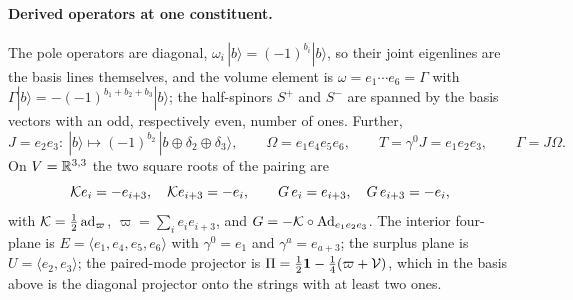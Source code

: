 \paragraph{Derived operators at one constituent.} The pole operators are diagonal, $\omega_i\,|b\rangle=(-1)^{b_i}|b\rangle$, so their joint eigenlines are the basis lines
themselves, and the volume element is $\omega=e_1\cdots e_6=\Gamma$ with $\Gamma|b\rangle=-(-1)^{b_1+b_2+b_3}|b\rangle$; the half-spinors $S^+$ and $S^-$ are spanned by the basis
vectors with an odd, respectively even, number of ones. Further,
\[
J=e_2e_3:\ |b\rangle\mapsto(-1)^{b_2}\,|b\oplus\delta_2\oplus\delta_3\rangle,\qquad \Omega=e_1e_4e_5e_6,\qquad T=\gamma^0J=e_1e_2e_3,\qquad \Gamma=J\Omega .
\]
On $V=\mathbb{R}^{3,3}$ the two square roots of the pairing are
\[
\mathcal K e_i=-e_{i+3},\quad \mathcal K e_{i+3}=-e_i,\qquad G\,e_i=e_{i+3},\quad G\,e_{i+3}=-e_i ,
\]
with $\mathcal K=\tfrac12\operatorname{ad}_{\varpi}$, $\varpi=\sum_ie_ie_{i+3}$, and $G=-\mathcal K\circ\operatorname{Ad}_{e_1e_2e_3}$. The interior four-plane is $E=\langle e_1,e_4,e_5,e_6\rangle$ with
$\gamma^0=e_1$ and $\gamma^a=e_{a+3}$; the surplus plane is $U=\langle e_2,e_3\rangle$; the paired-mode projector is $\Pi=\tfrac12\mathbf 1-\tfrac14(\varpi+\mathcal V)$, which in
the basis above is the diagonal projector onto the strings with at least two ones.

